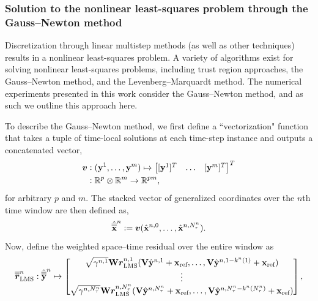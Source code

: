 \subsubsection{Solution to the nonlinear least-squares problem through the Gauss--Newton method}
Discretization through linear multistep methods (as well as other techniques) 
results in a nonlinear least-squares problem.
A variety of algorithms exist for solving nonlinear  
least-squares problems, including trust region approaches, the Gauss–Newton method, and the Levenberg–Marquardt method.  
The numerical experiments presented in this work consider the Gauss--Newton method, and as such we outline this approach here. 

To describe the Gauss--Newton method, we first define a ``vectorization" function that takes a tuple of time-local solutions at each time-step instance and outputs 
a concatenated vector, 
\begin{align*}
 \unroll &\vcentcolon (\stateyDiscreteArg{1},\ldots,\stateyDiscreteArg{m} ) \mapsto \begin{bmatrix} [\stateyDiscreteArg{1}]^T & \ldots & [\stateyDiscreteArg{m}]^T \end{bmatrix}^T  \\
&\vcentcolon \RR{p} \otimes \RR{m} \rightarrow \RR{pm},
\end{align*}
for arbitrary $p$ and $m$. The stacked vector of generalized coordinates over the $n$th time window are then defined as, 
\begin{equation*}
\genstatecollocMatSlabArg{n} \defeq 
\unroll (\genstateDiscreteArg{n,0},\ldots,\genstateDiscreteArg{n,\nstepsArg{n}} ).
\end{equation*}
Now, define the weighted space--time residual over the entire window as
\begin{equation*}
\residLMSSlabArg{n} : \genstatecollocMatySlabArg{n} \mapsto \begin{bmatrix}
 \sqrt{\quadWeightsLMSScalarArg{n}{1} } \stweightingMatOneArg{n,1} \residLMSArg{n,1}( \basisspace \genstateyDiscreteArgnt{n,1} + \stateIntercept, \ldots,\basisspace \genstateyDiscreteArgnt{n,1 - k^n(1) }  + \stateIntercept) \\
\vdots \\
 \sqrt{\quadWeightsLMSScalarArg{n}{\nstepsArg{n}} } \stweightingMatOneArg{n,\nstepsArg{n}} \residLMSArg{n,\nstepsArg{n}}( \basisspace \genstateyDiscreteArgnt{n,\nstepsArg{n}} + \stateIntercept, \ldots,\basisspace \genstateyDiscreteArgnt{n,\nstepsArg{n} - k^n(\nstepsArg{n}) } + \stateIntercept) \\
\end{bmatrix},
\end{equation*}

